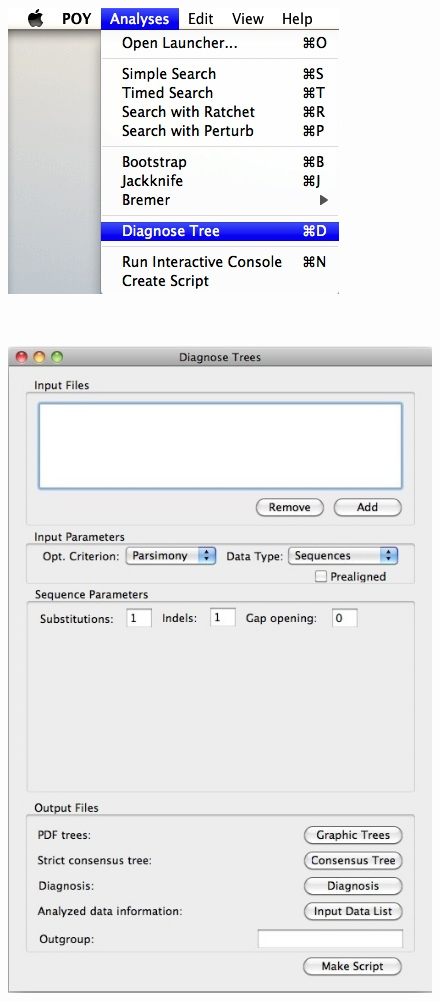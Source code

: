 {\begin{figure}
\centering
\begin{minipage}[c]{0.45\textwidth}
   		\includegraphics[width=\textwidth]{doc/figures/diagnose_menu.jpg}
\end{minipage}
\,
\begin{minipage}[c]{0.52\textwidth}
	   	\includegraphics[width=\textwidth]{doc/figures/diagnose_window.jpg}

\end{minipage}
\end{figure}}
